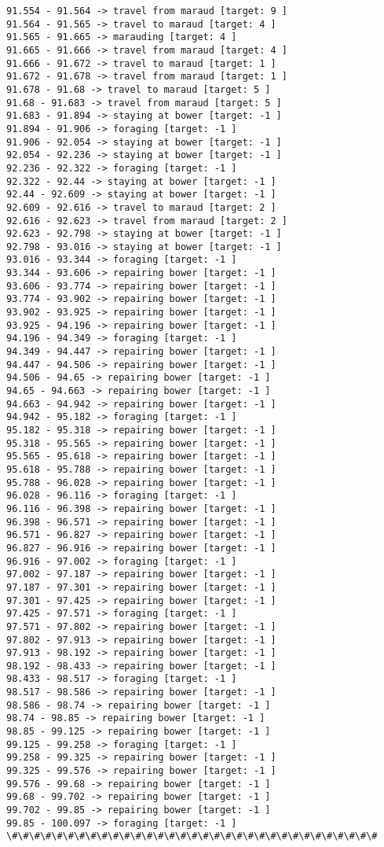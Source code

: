 \documentclass[11pt]{article}
\begin{document}
\begin{Verbatim}[commandchars=\\\{\}]
91.554 - 91.564 -> travel from maraud [target: 9 ]
91.564 - 91.565 -> travel to maraud [target: 4 ]
91.565 - 91.665 -> marauding [target: 4 ]
91.665 - 91.666 -> travel from maraud [target: 4 ]
91.666 - 91.672 -> travel to maraud [target: 1 ]
91.672 - 91.678 -> travel from maraud [target: 1 ]
91.678 - 91.68 -> travel to maraud [target: 5 ]
91.68 - 91.683 -> travel from maraud [target: 5 ]
91.683 - 91.894 -> staying at bower [target: -1 ]
91.894 - 91.906 -> foraging [target: -1 ]
91.906 - 92.054 -> staying at bower [target: -1 ]
92.054 - 92.236 -> staying at bower [target: -1 ]
92.236 - 92.322 -> foraging [target: -1 ]
92.322 - 92.44 -> staying at bower [target: -1 ]
92.44 - 92.609 -> staying at bower [target: -1 ]
92.609 - 92.616 -> travel to maraud [target: 2 ]
92.616 - 92.623 -> travel from maraud [target: 2 ]
92.623 - 92.798 -> staying at bower [target: -1 ]
92.798 - 93.016 -> staying at bower [target: -1 ]
93.016 - 93.344 -> foraging [target: -1 ]
93.344 - 93.606 -> repairing bower [target: -1 ]
93.606 - 93.774 -> repairing bower [target: -1 ]
93.774 - 93.902 -> repairing bower [target: -1 ]
93.902 - 93.925 -> repairing bower [target: -1 ]
93.925 - 94.196 -> repairing bower [target: -1 ]
94.196 - 94.349 -> foraging [target: -1 ]
94.349 - 94.447 -> repairing bower [target: -1 ]
94.447 - 94.506 -> repairing bower [target: -1 ]
94.506 - 94.65 -> repairing bower [target: -1 ]
94.65 - 94.663 -> repairing bower [target: -1 ]
94.663 - 94.942 -> repairing bower [target: -1 ]
94.942 - 95.182 -> foraging [target: -1 ]
95.182 - 95.318 -> repairing bower [target: -1 ]
95.318 - 95.565 -> repairing bower [target: -1 ]
95.565 - 95.618 -> repairing bower [target: -1 ]
95.618 - 95.788 -> repairing bower [target: -1 ]
95.788 - 96.028 -> repairing bower [target: -1 ]
96.028 - 96.116 -> foraging [target: -1 ]
96.116 - 96.398 -> repairing bower [target: -1 ]
96.398 - 96.571 -> repairing bower [target: -1 ]
96.571 - 96.827 -> repairing bower [target: -1 ]
96.827 - 96.916 -> repairing bower [target: -1 ]
96.916 - 97.002 -> foraging [target: -1 ]
97.002 - 97.187 -> repairing bower [target: -1 ]
97.187 - 97.301 -> repairing bower [target: -1 ]
97.301 - 97.425 -> repairing bower [target: -1 ]
97.425 - 97.571 -> foraging [target: -1 ]
97.571 - 97.802 -> repairing bower [target: -1 ]
97.802 - 97.913 -> repairing bower [target: -1 ]
97.913 - 98.192 -> repairing bower [target: -1 ]
98.192 - 98.433 -> repairing bower [target: -1 ]
98.433 - 98.517 -> foraging [target: -1 ]
98.517 - 98.586 -> repairing bower [target: -1 ]
98.586 - 98.74 -> repairing bower [target: -1 ]
98.74 - 98.85 -> repairing bower [target: -1 ]
98.85 - 99.125 -> repairing bower [target: -1 ]
99.125 - 99.258 -> foraging [target: -1 ]
99.258 - 99.325 -> repairing bower [target: -1 ]
99.325 - 99.576 -> repairing bower [target: -1 ]
99.576 - 99.68 -> repairing bower [target: -1 ]
99.68 - 99.702 -> repairing bower [target: -1 ]
99.702 - 99.85 -> repairing bower [target: -1 ]
99.85 - 100.097 -> foraging [target: -1 ]
\#\#\#\#\#\#\#\#\#\#\#\#\#\#\#\#\#\#\#\#\#\#\#\#\#\#\#\#\#\#\#\#\#



\end{Verbatim}
\end{document}
